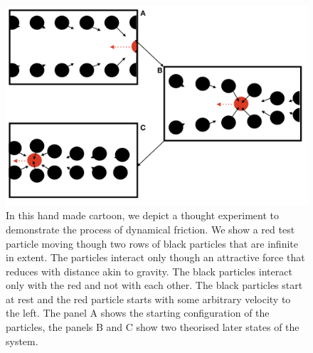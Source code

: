 \begin{figure}[h!]
    \centering
    \includegraphics[width = \linewidth]{Figures/Chapter2/Dynamical_Friction.png}
    \caption{In this hand made cartoon, we depict a thought experiment to demonstrate the process of dynamical friction. We show a red test particle moving though two rows of black particles that are infinite in extent. The particles interact only though an attractive force that reduces with distance akin to gravity. The black particles interact only with the red and not with each other. The black particles start at rest and the red particle starts with some arbitrary velocity to the left. The panel A shows the starting configuration of the particles, the panels B and C show two theorised later states of the system.}
    \label{fig:Tdyn_toon}
\end{figure}

